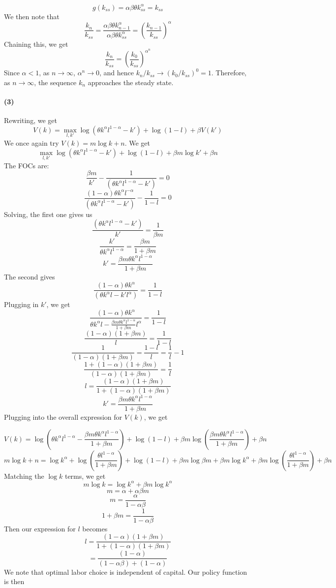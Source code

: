 \documentclass[10pt,letter]{article}
\newcommand{\problempart}[1]{\paragraph{#1}}
\begin{document}
\[ g(k_{ss})= \alpha\beta\theta k_{ss}^\alpha  = k_{ss} \]
We then note that
\[ \frac{k_n}{k_{ss}} = \frac{\alpha\beta\theta k_{n-1}^\alpha}{\alpha\beta\theta k_{ss}^{\alpha}} = \left(\frac{k_{n-1}}{k_{ss}} \right)^\alpha \]
Chaining this, we get
\[ \frac{k_n}{k_{ss}} = \left(\frac{k_0}{k_{ss}}\right)^{\alpha^n} \]
Since $\alpha < 1$, as $n\to \infty$, $\alpha^n \to 0$, and hence $k_n / k_{ss} \to (k_0/k_{ss})^0 = 1$. Therefore, as $n \to \infty$, the sequence $k_n$ approaches the steady state.
\problempart{(3)} Rewriting, we get
\[ V(k) = \max_{l, k'} \log (\theta k^\alpha l^{1-\alpha} - k') + \log(1-l) + \beta V(k') \]
We once again try $V(k) = m\log k + n$. We get
\[ \max_{l, k'} \log(\theta k^\alpha l^{1-\alpha} - k') + \log(1-l) + \beta m \log k' + \beta n \]
The FOCs are:
\[\frac{\beta m }{k'} - \frac{1}{(\theta k^\alpha l^{1-\alpha} - k')} = 0 \]
\[\frac{(1-\alpha)\theta k^\alpha l^{-\alpha}}{(\theta k^\alpha l^{1-\alpha} - k')} - \frac{1}{1-l} = 0 \]
Solving, the first one gives us
\[\frac{(\theta k^\alpha l^{1-\alpha} - k')}{k'} = \frac{1}{\beta m}  \]
\[ \frac{k'}{\theta k^\alpha l^{1-\alpha} } = \frac{\beta m}{1 + \beta m} \]
\[ k'  = \frac{\beta m\theta k^\alpha l^{1-\alpha}}{1 + \beta m} \]
The second gives
\[\frac{(1-\alpha)\theta k^\alpha }{(\theta k^\alpha l - k'l^\alpha)} = \frac{1}{1-l}  \]
Plugging in $k'$, we get
\[\frac{(1-\alpha)\theta k^\alpha }{\theta k^\alpha l - \frac{\beta m\theta k^\alpha l^{1-\alpha}}{1 + \beta m}l^\alpha} = \frac{1}{1-l}  \]
\[\frac{(1-\alpha)(1 + \beta m)}{l} = \frac{1}{1-l}  \]
\[\frac{1 }{(1-\alpha)(1 + \beta m)} = \frac{1-l}{l} = \frac{1}{l} - 1 \]
\[\frac{1 + (1-\alpha)(1 + \beta m)}{(1-\alpha)(1 + \beta m)} = \frac{1}{l} \]
\[ l = \frac{(1-\alpha)(1 + \beta m)}{1 + (1-\alpha)(1 + \beta m)} \]
\[ k' = \frac{\beta m\theta k^\alpha l^{1-\alpha}}{1 + \beta m}  \]
Plugging into the overall expression for $V(k)$, we get

\[ V(k) = \log \left(\theta k^\alpha l^{1-\alpha} - \frac{\beta m\theta k^\alpha l^{1-\alpha}}{1 + \beta m}\right) + \log(1-l) + \beta m \log \left(\frac{\beta m\theta k^\alpha l^{1-\alpha}}{1 + \beta m}\right) + \beta n \]
\[ m \log k + n = \log k^\alpha + \log \left(\frac{\theta l^{1-\alpha}}{1 + \beta m}\right) + \log(1-l) + \beta m \log \beta m + \beta m \log k^\alpha + \beta m \log \left(\frac{\theta l^{1-\alpha}}{1 + \beta m}\right) + \beta n \]
Matching the $\log k$ terms, we get
\[ m \log k = \log k^\alpha + \beta m \log k^\alpha \]
\[ m = \alpha + \alpha\beta m \]
\[ m = \frac{\alpha}{1-\alpha\beta} \]
\[ 1 + \beta m = \frac{1}{1-\alpha\beta}\]
Then our expression for $l$ becomes
\[ l = \frac{(1-\alpha)(1 + \beta m)}{1 + (1-\alpha)(1 + \beta m)} \]
\[ = \frac{(1-\alpha)}{(1-\alpha\beta) + (1-\alpha)} \]
We note that optimal labor choice is independent of capital. Our policy function is then
\end{document}

